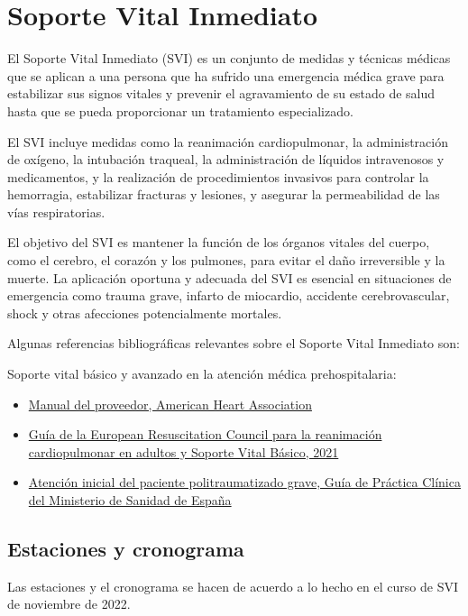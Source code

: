 \section{Soporte Vital Inmediato}
El Soporte Vital Inmediato (SVI) es un conjunto de medidas y técnicas médicas que se aplican a una persona que ha sufrido una emergencia médica grave para estabilizar sus signos vitales y prevenir el agravamiento de su estado de salud hasta que se pueda proporcionar un tratamiento especializado.

El SVI incluye medidas como la reanimación cardiopulmonar, la administración de oxígeno, la intubación traqueal, la administración de líquidos intravenosos y medicamentos, y la realización de procedimientos invasivos para controlar la hemorragia, estabilizar fracturas y lesiones, y asegurar la permeabilidad de las vías respiratorias.

El objetivo del SVI es mantener la función de los órganos vitales del cuerpo, como el cerebro, el corazón y los pulmones, para evitar el daño irreversible y la muerte. La aplicación oportuna y adecuada del SVI es esencial en situaciones de emergencia como trauma grave, infarto de miocardio, accidente cerebrovascular, shock y otras afecciones potencialmente mortales.

Algunas referencias bibliográficas relevantes sobre el Soporte Vital Inmediato son:

Soporte vital básico y avanzado en la atención médica prehospitalaria:
\begin{itemize}[topsep=0pt, partopsep=0pt,itemsep=0pt,parsep=0pt]
    \item \href{https://www.heart.org/-/media/files/health-topics/chain-of-survival/cpr-quality/aha-manual-svb-aha-version-spanish.pdf}{Manual del proveedor, American Heart Association}
    \item \href{https://erc.europa.eu/sites/erc/files/documents/2021-05/2021\_European\_guidelines\_on\_resuscitation.pdf}{Guía de la European Resuscitation Council para la reanimación cardiopulmonar en adultos y Soporte Vital Básico, 2021}
    \item \href{https://portal.guiasalud.es/wp-content/uploads/2019/11/GPC_2019_Paciente_politraumatizado_grave\_COMPL.pdf}{Atención inicial del paciente politraumatizado grave, Guía de Práctica Clínica del Ministerio de Sanidad de España}
\end{itemize}
\subsection{Estaciones y cronograma}
Las estaciones y el cronograma se hacen de acuerdo a lo hecho en el curso de SVI de noviembre de 2022. 

